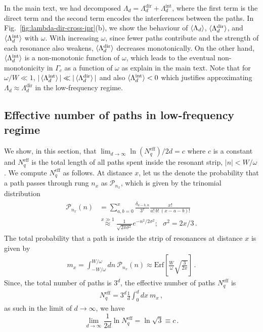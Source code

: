 \documentclass[aps,prl,twocolumn,superscriptaddress,nobalancelastpage,longbibliography]{revtex4-2}
\newcommand\eq[1]{\begin{align}#1\end{align}}
\begin{document}
In the main text, we had decomposed $\Lambda_d = \Lambda_d^\mathrm{dir}+\Lambda_d^\mathrm{int}$, where the first term is the direct term and the second term encodes the interferences between the paths. 
In Fig.~\ref{fig:lambda-dir-cross-ipr}(b), we show the behaviour of $\braket{\Lambda_d}$, $\braket{\Lambda_d^\mathrm{dir}}$, and $\braket{\Lambda_d^\mathrm{int}}$ with $\omega$.
With increasing $\omega$, since fewer paths contribute and the strength of each resonance also weakens, $\braket{\Lambda_d^\mathrm{dir}}$ decreases monotonically.
On the other hand, $\braket{\Lambda_d^\mathrm{int}}$ is a non-monotonic function of $\omega$, which leads to the eventual non-monotonicity in $\Gamma_c$ as a function of $\omega$ as explain in the main text.
Note that for $\omega/W\ll 1$, $\vert\braket{\Lambda_d^\mathrm{int}}\vert \ll \vert\braket{\Lambda_d^\mathrm{dir}}\vert$ and also $\braket{\Lambda_d^\mathrm{int}} <0$ which justifies approximating $\Lambda_d\approx\Lambda_d^\mathrm{dir}$ in the low-frequency regime.






\subsection{Effective number of paths in low-frequency regime}
We show, in this section, that $\lim_{d\to\infty}\ln(N_q^\mathrm{eff})/2d =c$ where $c$ is a constant and $N_q^\mathrm{eff}$ is the total length of all paths spent inside the resonant strip, $\vert n \vert <W/\omega$.
We compute $N_q^\mathrm{eff}$ as follows. At distance $x$, let us the denote the probability that a path passes through rung $n_x$ as $\mathcal{P}_{n_x}$, which is given by the trinomial distribution
\eq{
\begin{split}
\mathcal{P}_{n_x}(n) &= \sum_{a,b=0}^x\frac{\delta_{a-b,n}}{3^x}\frac{x!}{a!~b!~(x-a-b)!}\\
&\overset{x\gg 1}{\approx} \frac{1}{\sqrt{2\pi\sigma^2}}e^{-n^2/2\sigma^2};~~~\sigma^2 = 2x/3\,.
\end{split}
}
The total probability that a path is inside the strip of resonances at distance $x$ is given by 
\eq{
m_x=\int_{-W/\omega}^{W/\omega}dn~\mathcal{P}_{n_x}(n) \approx \mathrm{Erf}\left[\frac{W}{\omega}\sqrt{\frac{3}{2x}}\right]\,.
}
Since, the total number of paths is $3^d$, the effective number of paths $N_q^\mathrm{eff}$ is
\eq{
N_q^\mathrm{eff} = 3^d \frac{1}{d}\int_0^d dx~m_x\,,
\label{eq:neff}
}
as such in the limit of $d\to\infty$, we have 
\begin{equation}
\lim_{d\to\infty}\frac{1}{2d}\ln N_q^\mathrm{eff} = \ln\sqrt{3}\equiv c\,.
\label{eq:neff1}
\end{equation}
\end{document}
